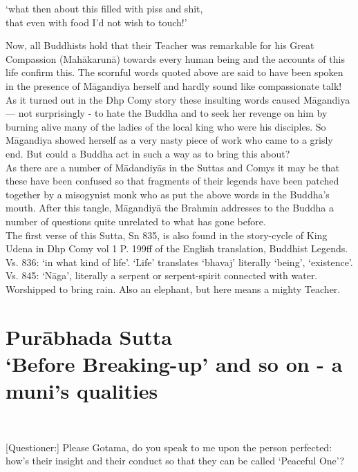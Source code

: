 \begin{MyDescription}
`what then about this filled with piss and shit,\\
that even with food I'd not wish to touch!'
\end{MyDescription}

Now, all Buddhists hold that their Teacher was remarkable for his Great Compassion (Mah\=akarun\=a) towards every human being and the accounts of this life confirm this. The scornful words quoted above are said to have been spoken in the presence of M\=agandiya herself and hardly sound like compassionate talk! As it turned out in the Dhp Comy story these insulting words caused M\=agandiya — not surprisingly - to hate the Buddha and to seek her revenge on him by burning alive many of the ladies of the local king who were his disciples. So M\=agandiya showed herself as a very nasty piece of work who came to a grisly end. But could a Buddha act in such a way as to bring this about?\\

As there are a number of M\=adandiy\=as in the Suttas and Comys it may be that these have been confused so that fragments of their legends have been patched together by a misogynist monk who as put the above words in the Buddha's mouth. After this tangle, M\=agandiy\=a the Brahmin addresses to the Buddha a number of questions quite unrelated to what has gone before.\\

The first verse of this Sutta, Sn 835, is also found in the story-cycle of King Udena in Dhp Comy vol 1 P. 199ff of the English translation, Buddhist Legends.\\

Vs. 836: `in what kind of life'. `Life' translates `bhavaj' literally `being', `existence'.\\

Vs. 845: `N\=aga', literally a serpent or serpent-spirit connected with water. Worshipped to bring rain. Also an elephant, but here means a mighty Teacher.

\chapter{Pur\=abhada Sutta\\ `Before Breaking-up' and so on - a muni's qualities}\\


\begin{MyDescription}{}[Questioner:]
Please Gotama, do you speak to me
upon the person perfected:
how's their insight and their conduct
so that they can be called `Peaceful One'?
\end{MyDescription}

